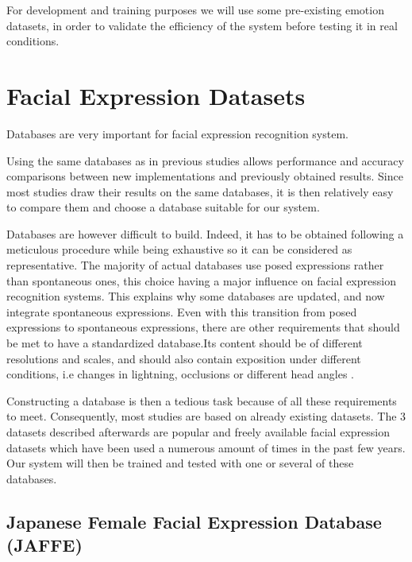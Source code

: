 \noindent For development and training purposes we will use some pre-existing emotion datasets, in order to validate the efficiency of the system before testing it in real conditions.
\newline

\section{Facial Expression Datasets}

\vspace{\baselineskip}
\noindent Databases are very important for facial expression recognition system.
\newline

\noindent Using the same databases as in previous studies allows performance and accuracy comparisons between new implementations and previously obtained results. Since most studies draw their results on the same databases, it is then relatively easy to compare them and choose a database suitable for our system.
\newline

\noindent Databases are however difficult to build. Indeed, it has to be obtained following a meticulous procedure while being exhaustive so it can be considered as representative. The majority of actual databases use posed expressions rather than spontaneous ones, this choice having a major influence on facial expression recognition systems. This explains why some databases are updated, and now integrate spontaneous expressions. Even with this transition from posed expressions to spontaneous expressions, there are other requirements that should be met to have a standardized database.Its content should be of different resolutions and scales, and should also contain exposition under different conditions, i.e changes in lightning, occlusions or different head angles \cite{BET12}.  
\newline

\noindent Constructing a database is then a tedious task because of all these requirements to meet. Consequently, most studies are based on already existing datasets. The 3 datasets described afterwards are popular and freely available facial expression datasets which have been used a numerous amount of times in the past few years. Our system will then be trained and tested with one or several of these databases.
\newline

\subsection{Japanese Female Facial Expression Database (JAFFE)}

